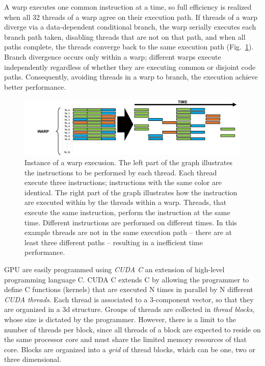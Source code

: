 A warp executes one common instruction at a time, so full efficiency is realized when all 32 threads of a warp agree on their execution path. If threads of a warp diverge via a data-dependent conditional branch, the warp serially executes each branch path taken, disabling threads that are not on that path, and when all paths complete, the threads converge back to the same execution path (Fig.~\ref{fig:warp-instruction}). Branch divergence occurs only within a warp; different warps execute independently regardless of whether they are executing common or disjoint code paths. Consequently, avoiding threads in a warp to branch, the execution achieve better performance.
\begin{figure}
   \centering
   \includegraphics[width=13.5cm]{Figs/Warp_instruction.png}
   \caption{Instance of a warp execusion. The left part of the graph illustrates the instructions to be performed by each thread. Each thread execute three instructions; instructions with the same color are identical. The right part of the graph illustrates how the instruction are executed within by the threads within a warp. Threads, that execute the same instruction, perform the instruction at the same time. Different instructions are performed on different times. In this example threads are not in the same execution path -- there are at least three different paths -- resulting in a inefficient time performance.} \label{fig:warp-instruction}
\end{figure}

GPU are easily programmed using \textit{CUDA C} an extension of high-level programming language C. CUDA C extends C by allowing the programmer to define C functions (kernels) that are executed N times in parallel by N different \textit{CUDA threads}. Each thread is associated to a 3-component vector, so that they are organized in a 3d structure. Groups of threads are collected in \textit{thread blocks}, whose size is dictated by the programmer. However, there is a limit to the number of threads per block, since all threads of a block are expected to reside on the same processor core and must share the limited memory resources of that core. Blocks are organized into a \textit{grid} of thread blocks, which can be one, two or three dimensional.

